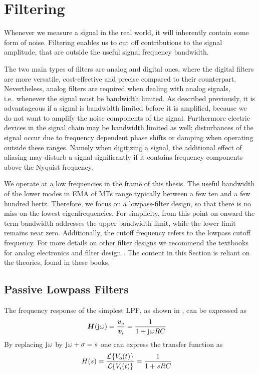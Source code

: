 \section{Filtering}
Whenever we measure a signal in the real world, it will inherently contain some form of noise. Filtering enables us to cut off contributions to the signal amplitude, that are outside the useful signal frequency bandwidth.

The two main types of filters are analog and digital ones, where the digital filters are more versatile, cost-effective and precise compared to their counterpart. Nevertheless, analog filters are required when dealing with analog signals, i.e.\ whenever the signal must be bandwidth limited. As described previously, it is advantageous if a signal is bandwidth limited before it is amplified, because we do not want to amplify the noise components of the signal. Furthermore electric devices in the signal chain may be bandwidth limited as well; disturbances of the signal occur due to frequency dependent phase shifts or damping when operating outside these ranges. Namely when digitizing a signal, the additional effect of aliasing may disturb a signal significantly if it contains frequency components above the Nyquist frequency.

We operate at a low frequencies in the frame of this thesis. The useful bandwidth of the lower modes in \ac{EMA} of \ac{MT}s range typically between a few ten and a few hundred hertz. Therefore, we focus on a lowpass-filter design, so that there is no miss on the lowest eigenfrequencies. For simplicity, from this point on onward the term bandwidth addresses the upper bandwidth limit, while the lower limit remains near zero. Additionally, the cutoff frequency refers to the lowpass cutoff frequency. For more details on other filter designs we recommend the textbooks for analog electronics and filter design \cite{Tietze2008EC, Stiny2019AeB, williams2014analog}. The content in this Section is reliant on the theories, found in these books.

\subsection{Passive Lowpass Filters}
The frequency response of the simplest \ac{LPF}, as shown in , can be expressed as
\begin{align}
  \bm{H}(\mathrm{j}\mkern1mu\omega) &= \frac{\bm{v}_o}{\bm{v}_i} = \frac{1}{1+\mathrm{j}\mkern1mu\omega RC}
\end{align}
By replacing $\mathrm{j}\mkern1mu\omega$ by $\mathrm{j}\mkern1mu\omega+\sigma = s$ one can express the transfer function as
\begin{align}
  H(s) &= \frac{\mathcal{L}\{V_o(t)\}}{\mathcal{L}\{V_i(t)\}} = \frac{1}{1 + sRC}
\end{align}

